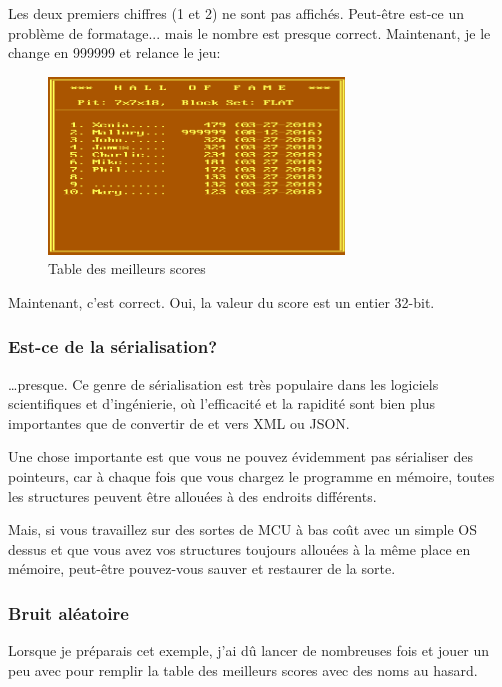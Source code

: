Les deux premiers chiffres (1 et 2) ne sont pas affichés. Peut-être est-ce un problème
de formatage... mais le nombre est presque correct.
Maintenant, je le change en 999999 et relance le jeu:

\begin{figure}[H]
\centering
\includegraphics[width=0.7\textwidth]{advanced/550_more_structs/blockout/hs999999.png}
\caption{Table des meilleurs scores}
\end{figure}

Maintenant, c'est correct. Oui, la valeur du score est un entier 32-bit.

\subsubsection{Est-ce de la sérialisation?}

\dots presque.
Ce genre de sérialisation est très populaire dans les logiciels scientifiques et
d'ingénierie, où l'efficacité et la rapidité sont bien plus importantes que de convertir
de et vers \ac{XML} ou \ac{JSON}.

Une chose importante est que vous ne pouvez évidemment pas sérialiser des pointeurs,
car à chaque fois que vous chargez le programme en mémoire, toutes les structures
peuvent être allouées à des endroits différents.

Mais, si vous travaillez sur des sortes de \ac{MCU} à bas coût avec un simple \ac{OS}
dessus et que vous avez vos structures toujours allouées à la même place en mémoire,
peut-être pouvez-vous sauver et restaurer de la sorte.

\subsubsection{Bruit aléatoire}

Lorsque je préparais cet exemple, j'ai dû lancer  de nombreuses fois
et jouer un peu avec pour remplir la table des meilleurs scores avec des noms au
hasard.

